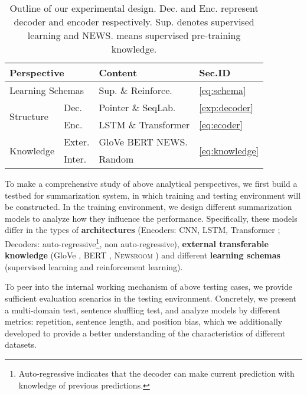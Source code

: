 \documentclass[11pt,a4paper]{article}
\begin{document}
\begin{table}[htbp]
  \centering \footnotesize
    \begin{tabular}{ll|ll}
    \toprule
    \multicolumn{2}{l}{\textbf{Perspective}} & \textbf{Content} & \multicolumn{1}{l}{\textbf{Sec.ID}} \\
    \midrule
    \multicolumn{2}{l|}{Learning Schemas} & Sup.  \& Reinforce. & \ref{eq:schema} \\
    \midrule
    \multirow{2}[2]{*}{Structure} & Dec.  & Pointer \& SeqLab. & \ref{exp:decoder} \\
          & Enc.  & LSTM \& Transformer & \ref{eq:ecoder} \\
    \midrule
    \multirow{2}[2]{*}{Knowledge} & Exter. & GloVe   BERT  NEWS. & \multirow{2}[2]{*}{\ref{eq:knowledge}} \\
          & Inter. & Random &  \\
    \bottomrule
    \end{tabular}\caption{Outline of our experimental design.
      Dec. and Enc. represent decoder and encoder respectively. Sup. denotes supervised learning and NEWS. means supervised pre-training knowledge.}
  \label{tab:addlabel}\end{table}







To make a comprehensive study of above analytical perspectives, we first build a testbed for summarization system, in which training and testing environment will be constructed.
In the training environment, we design different summarization models to analyze how they influence the performance. Specifically, these models differ in the types of \textbf{architectures} (Encoders: CNN, LSTM, Transformer \cite{vaswani2017attention}; Decoders: auto-regressive\footnote{Auto-regressive indicates that the decoder can make current prediction with knowledge of previous predictions.}, non auto-regressive),  \textbf{external transferable knowledge} (GloVe  \cite{pennington2014glove}, BERT \cite{devlin2018bert}, \textsc{Newsroom} \cite{grusky2018newsroom}) and different \textbf{learning schemas} (supervised learning and reinforcement learning).


To peer into the internal working mechanism of above testing cases, we provide sufficient evaluation scenarios in the testing environment.
Concretely, we present a multi-domain test, sentence shuffling test, and analyze models by different metrics: repetition, sentence length, and position bias,
which we additionally developed to provide a better understanding of the characteristics of different datasets.
\end{document}
